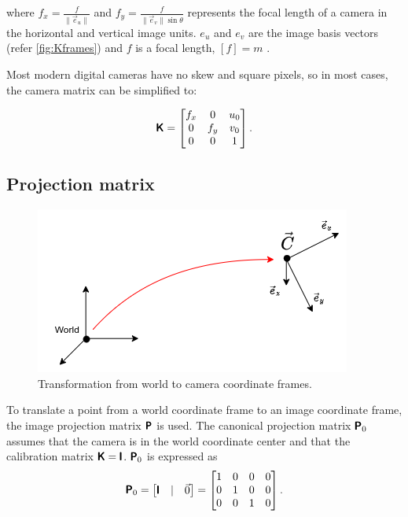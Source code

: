 where $f_x = \frac{f}{\lVert \vec{e}_u \rVert} $ and $f_y = \frac{f}{\lVert \vec{e}_v \rVert \sin{\theta}}$ represents the focal length of a camera in the horizontal and vertical image units.
$e_u$ and $e_v$ are the image basis vectors (refer \autoref{fig:Kframes}) and $f$ is a focal length, $[f] = m$ .

Most modern digital cameras have no skew and square pixels, so in most cases, the camera matrix can be simplified to:

\begin{equation}
    \label{eq:kmat}
    \pmb{\mathsf{K}} = \begin{bmatrix}
        f_x & 0 & u_0 \\
        0 & f_y & v_0 \\
        0 & 0 & 1 \\
    \end{bmatrix}.
\end{equation}

\subsection{Projection matrix}

\begin{figure}[ht]
    \centering
    \includegraphics[width=.5\textwidth]{graphics/frames.png}
    \caption{Transformation from world to camera coordinate frames.}
    \label{fig:frames}
\end{figure}

To translate a point from a world coordinate frame to an image coordinate frame, the image projection matrix $\pmb{\mathsf{P}}$ is used. 
The canonical projection matrix $\pmb{\mathsf{P}}_0$ assumes that the camera is in the world coordinate center and that the calibration matrix $\pmb{\mathsf{K}} = \pmb{\mathsf{I}}$.
$\pmb{\mathsf{P}}_0$ is expressed as
\begin{equation}
\pmb{\mathsf{P}}_0 = \begin{bmatrix} \pmb{\mathsf{I}} & | & \vec{0} \end{bmatrix} = 
    \begin{bmatrix}
    1 & 0 & 0 & 0 \\
    0 & 1 & 0 & 0 \\
    0 & 0 & 1 & 0 \\
    \end{bmatrix}.
\end{equation}

